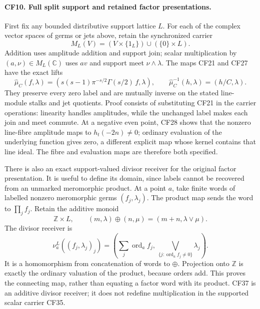 \paragraph{CF10. Full split support and retained factor presentations.}
First fix any bounded distributive support lattice
\(L\). For each of the complex vector spaces of
germs or jets above, retain the synchronized carrier
\[
 M_L(V)=(V\times\{1_L\})\cup(\{0\}\times L).
 \tag{CF35}
\]
Addition uses amplitude addition and support join;
scalar multiplication by \((a,\nu)\in M_L(\mathbb C)\)
uses \(a v\) and support meet \(\nu\wedge\lambda\).
The maps CF21 and CF27 have the exact lifts
\[
 \widehat\mu_C(f,\lambda)=
 \left(s(s-1)\pi^{-s/2}\Gamma(s/2)\,f,\lambda\right),
 \qquad
 \widehat\mu_C^{-1}(h,\lambda)=(h/C,\lambda).
 \tag{CF36}
\]
They preserve every zero label and are mutually inverse
on the stated line-module stalks and jet quotients.
Proof consists of substituting CF21 in the carrier
operations: linearity handles amplitudes, while the
unchanged label makes each join and meet commute.
At a negative even point, CF28 shows that the nonzero
line-fibre amplitude maps to \(h_t(-2n)\ne0\);
ordinary evaluation of the underlying function gives
zero, a different explicit map whose kernel contains
that line ideal. The fibre and evaluation maps are
therefore both specified.

There is also an exact support-valued divisor receiver
for the original factor presentation. It is useful
to define its domain, since labels cannot be recovered
from an unmarked meromorphic product.
At a point \(a\), take finite words of labelled
nonzero meromorphic germs \((f_j,\lambda_j)\).
The product map sends the word to \(\prod_j f_j\).
Retain the additive monoid
\[
 \mathbb Z\times L,\qquad
 (m,\lambda)\mathbin{\oplus}(n,\mu)
       =(m+n,\lambda\vee\mu).
\]
The divisor receiver is
\[
 \nu_a^L((f_j,\lambda_j)_j)
 =\left(\sum_j\operatorname{ord}_a f_j,\,
     \bigvee_{\{j:\operatorname{ord}_a f_j\ne0\}}\lambda_j
   \right).
 \tag{CF37}
\]
It is a homomorphism from concatenation of words to
\(\oplus\). Projection onto \(\mathbb Z\) is exactly
the ordinary valuation of the product, because orders
add. This proves the connecting map, rather than
equating a factor word with its product.
CF37 is an additive divisor receiver; it does not
redefine multiplication in the supported scalar
carrier CF35.

